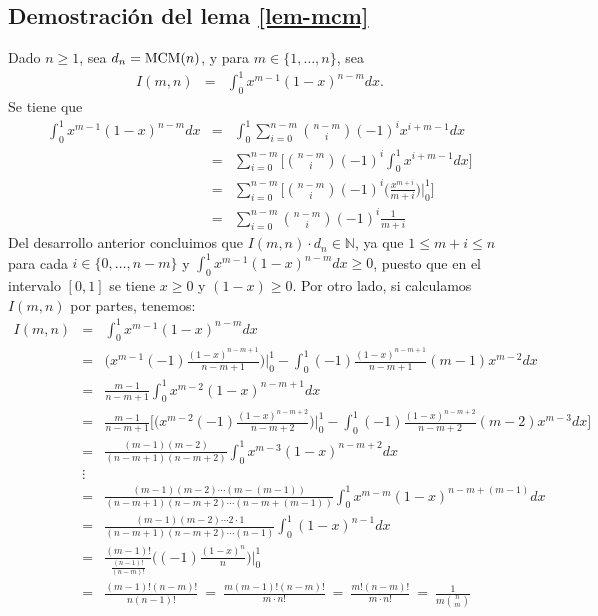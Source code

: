 \subsection{Demostración del lema \ref{lem-mcm}}
\label{app-lem-mcm}		

Dado $n \geq 1$, sea $d_n={\rm MCM}(n)$, y para $m \in \{1, \ldots, n\}$, sea  
		\begin{eqnarray*}
		I(m,n) &=& \int_{0}^{1}x^{m-1}(1-x)^{n-m}dx.
		\end{eqnarray*}
Se tiene que
		\begin{eqnarray*}
			\int_{0}^{1}x^{m-1}(1-x)^{n-m}dx  &=&
				  \int_{0}^{1}\sum_{i=0}^{n-m}{n-m\choose i}(-1)^ix^{i+m-1}dx\\
				  &=&
				  \sum_{i=0}^{n-m}\bigg[{n-m\choose i}(-1)^i \int_{0}^{1}x^{i+m-1}dx\bigg]\\
				  &=& \sum_{i=0}^{n-m}\bigg[{n-m\choose i}(-1)^i \bigg(\frac{x^{m+i}}{m+i}\bigg)\bigg\rvert_0 ^1\bigg]\\
				  &=&\sum_{i=0}^{n-m}{n-m\choose i}(-1)^i \frac{1}{m+i}
		\end{eqnarray*}
		Del desarrollo anterior concluimos que $I(m,n)\cdot d_n\in \mathbb{N}$, ya que $1 \leq m+i\leq n$ para cada $i \in \{0, \ldots, n-m\}$ y $\int_{0}^{1}x^{m-1}(1-x)^{n-m}dx \geq 0$, puesto que en el intervalo $[0,1]$ se tiene $x \geq 0$ y $(1-x) \geq 0$.
		Por otro lado, si calculamos $I(m,n)$ por partes, tenemos:	
		\begin{eqnarray*}
		I(m,n)&=&\int_{0}^{1}x^{m-1}(1-x)^{n-m}dx\\
		&=&\bigg(x^{m-1}(-1)\frac{(1-x)^{n-m+1}}{n-m+1}\bigg)\bigg\rvert_0 ^1 -\int_0^1(-1)\frac{(1-x)^{n-m+1}}{n-m+1}(m-1)x^{m-2}dx\\
		&=& \frac{m-1}{n-m+1}\int_{0}^{1}x^{m-2}(1-x)^{n-m+1}dx\\
		&=& \frac{m-1}{n-m+1}\bigg[\bigg(x^{m-2}(-1)\frac{(1-x)^{n-m+2}}{n-m+2}\bigg)\bigg\rvert_0 ^1 -\int_0^1(-1)\frac{(1-x)^{n-m+2}}{n-m+2}(m-2)x^{m-3}dx\bigg]\\
		&=& \frac{(m-1)(m-2)}{(n-m+1)(n-m+2)}\int_{0}^{1}x^{m-3}(1-x)^{n-m+2}dx\\
		& \vdots &\\
		&=& \frac{(m-1)(m-2)\cdots(m-(m-1))}{(n-m+1)(n-m+2)\cdots(n-m+(m-1))}\int_{0}^{1}x^{m-m}(1-x)^{n-m+(m-1)}dx\\
		&=& \frac{(m-1)(m-2)\cdots 2\cdot 1}{(n-m+1)(n-m+2)\cdots(n-1)}\int_{0}^{1}(1-x)^{n-1}dx\\
		&=& \frac{(m-1)!}{\frac{(n-1)!}{(n-m)!}}\bigg((-1)\frac{(1-x)^n}{n}\bigg)\bigg\rvert_0^1\\
		&= &\frac{(m-1)!(n-m)!}{n(n-1)!} \ = \ \frac{m(m-1)!(n-m)!}{m \cdot n!} \ = \ \frac{m!(n-m)!}{m\cdot n!} \ = \ \frac{1}{m{n\choose m}}
		\end{eqnarray*}
